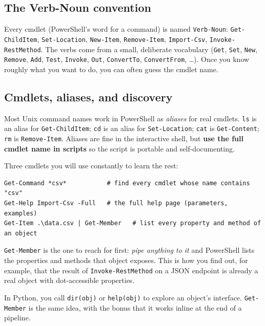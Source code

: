 \documentclass[11pt,a4paper]{article}
\newcommand{\cmd}[1]{\texttt{\textcolor{pwshKw}{#1}}}
\begin{document}
\subsection*{The Verb-Noun convention}

Every cmdlet (PowerShell's word for a command) is named
\texttt{Verb-Noun}: \cmd{Get-ChildItem}, \cmd{Set-Location},
\cmd{New-Item}, \cmd{Remove-Item}, \cmd{Import-Csv},
\cmd{Invoke-RestMethod}. The verbs come from a small, deliberate
vocabulary (\texttt{Get}, \texttt{Set}, \texttt{New}, \texttt{Remove},
\texttt{Add}, \texttt{Test}, \texttt{Invoke}, \texttt{Out},
\texttt{ConvertTo}, \texttt{ConvertFrom}, \dots). Once you know roughly
what you want to do, you can often guess the cmdlet name.

\subsection*{Cmdlets, aliases, and discovery}

Most Unix command names work in PowerShell as \emph{aliases} for
real cmdlets. \texttt{ls} is an alias for \cmd{Get-ChildItem};
\texttt{cd} is an alias for \cmd{Set-Location}; \texttt{cat} is
\cmd{Get-Content}; \texttt{rm} is \cmd{Remove-Item}. Aliases are
fine in the interactive shell, but \textbf{use the full cmdlet name
in scripts} so the script is portable and self-documenting.

Three cmdlets you will use constantly to learn the rest:

\begin{lstlisting}[style=pwshstyle]
Get-Command *csv*           # find every cmdlet whose name contains "csv"
Get-Help Import-Csv -Full   # the full help page (parameters, examples)
Get-Item .\data.csv | Get-Member   # list every property and method of an object
\end{lstlisting}

\cmd{Get-Member} is the one to reach for first: \emph{pipe anything to
it} and PowerShell lists the properties and methods that object
exposes. This is how you find out, for example, that the result of
\cmd{Invoke-RestMethod} on a JSON endpoint is already a real object with
dot-accessible properties.

\begin{compare}
In Python, you call \texttt{dir(obj)} or \texttt{help(obj)} to explore an
object's interface. \cmd{Get-Member} is the same idea, with the bonus
that it works inline at the end of a pipeline.
\end{compare}
\end{document}
